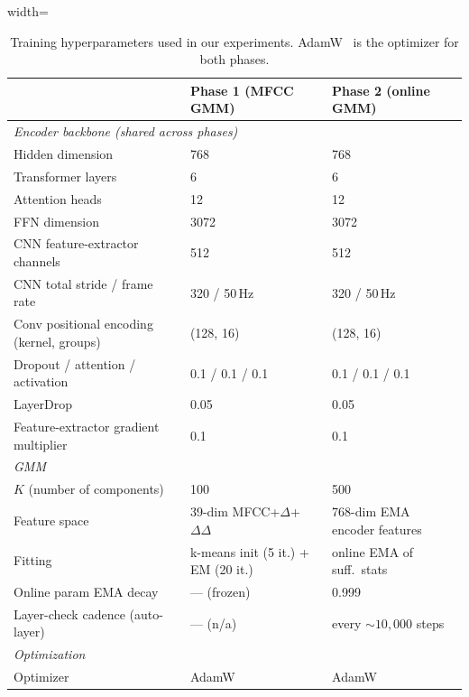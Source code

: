 \documentclass[9pt,twocolumn]{article}
\theoremstyle{plain}
\theoremstyle{definition}
\theoremstyle{remark}
\begin{document}
\begin{table}[h]
\caption{Training hyperparameters used in our experiments. AdamW~\citep{loshchilov2019adamw} is the optimizer for both phases.}
\label{tab:hyperparams}
\centering
\small
\begin{adjustbox}{width=\textwidth}
\begin{tabular}{l@{\hspace{1.5em}}l@{\hspace{1.5em}}l}
\toprule
& \textbf{Phase 1 (MFCC GMM)} & \textbf{Phase 2 (online GMM)} \\
\midrule
\multicolumn{3}{l}{\emph{Encoder backbone (shared across phases)}} \\
Hidden dimension                          & 768  & 768  \\
Transformer layers                        & 6    & 6    \\
Attention heads                           & 12   & 12   \\
FFN dimension                             & 3072 & 3072 \\
CNN feature-extractor channels            & 512  & 512  \\
CNN total stride / frame rate             & 320 / 50\,Hz & 320 / 50\,Hz \\
Conv positional encoding (kernel, groups) & (128, 16) & (128, 16) \\
Dropout / attention / activation          & 0.1 / 0.1 / 0.1 & 0.1 / 0.1 / 0.1 \\
LayerDrop                                 & 0.05 & 0.05 \\
Feature-extractor gradient multiplier     & 0.1  & 0.1  \\
\midrule
\multicolumn{3}{l}{\emph{GMM}} \\
$K$ (number of components)                & 100   & 500   \\
Feature space                             & 39-dim MFCC+$\Delta$+$\Delta\Delta$ & 768-dim EMA encoder features \\
Fitting                                   & k-means init (5 it.) + EM (20 it.) & online EMA of suff.\ stats \\
Online param EMA decay                    & --- (frozen) & 0.999 \\
Layer-check cadence (auto-layer)          & --- (n/a)    & every $\sim 10{,}000$ steps \\
\midrule
\multicolumn{3}{l}{\emph{Optimization}} \\
Optimizer                                 & AdamW & AdamW \\

\end{tabular}
\end{adjustbox}
\end{table}
\end{document}

